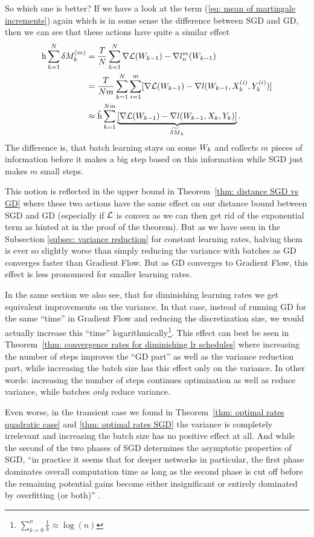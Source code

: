 So which one is better?  If we have a look at the term (\ref{eq: mean of
martingale increments}) again which is in some sense the difference between SGD
and GD, then we can see that these actions have quite a similar effect
\begin{align*}
	\text{h}\sum_{k=1}^N\delta M_k^{(m)}
	&=\frac{T}{N}\sum_{k=1}^N
	\nabla\mathcal{L}(W_{k-1})- \nabla l_n^m(W_{k-1})\\
	&=\frac{T}{Nm}\sum_{k=1}^N\sum_{i=1}^m
	[\nabla\mathcal{L}(W_{k-1})-\nabla l(W_{k-1},X^{(i)}_k, Y^{(i)}_k)]\\
	&\approx \tilde{\text{h}} \sum_{k=1}^{Nm}
	\underbrace{
		[\nabla\mathcal{L}(W_{k-1})-\nabla l(W_{k-1},X_k, Y_k)]
	}_{\widetilde{\delta M}_k}.
\end{align*}
The difference is, that batch learning stays on some \(W_k\) and collects
\(m\) pieces of information before it makes a big step based on this information
while SGD just makes \(m\) small steps.

This notion is reflected in the upper bound in Theorem~\ref{thm: distance SGD vs
GD} where these two actions have the same effect on our distance bound between SGD and
GD (especially if \(\mathcal{L}\) is convex as we can then get rid of the exponential
term as hinted at in the proof of the theorem). But as we have seen in the
Subsection \ref{subsec: variance reduction} for constant learning rates, halving
them is ever so slightly worse than simply reducing the variance
with batches as GD converges faster than Gradient Flow. But as GD converges
to Gradient Flow, this effect is less pronounced for smaller learning rates.

In the same section we also see, that for diminishing learning rates we get
equivalent improvements on the variance.
In that case, instead of running GD for the same ``time'' in Gradient Flow and
reducing the discretization size, we would actually increase this ``time''
logarithmically\footnote{\(\sum_{k=0}^n\tfrac{1}{k}\approx\log(n)\)}. This effect
can best be seen in Theorem~\ref{thm: convergence rates for diminishing lr
schedules} where increasing the number of steps improves the ``GD part'' as well
as the variance reduction part, while increasing the batch size has this
effect only on the variance. In other words: increasing the number of steps
continues optimization as well as reduce variance, while batches \emph{only}
reduce variance.

Even worse, in the transient case we found in Theorem~\ref{thm:
optimal rates quadratic case} and \ref{thm: optimal rates SGD} the variance is
completely irrelevant and increasing the batch size has no positive effect at
all. And while the second of the two phases of SGD \parencite[first observed
by][]{darkenFasterStochasticGradient1991} determines the asymptotic properties
of SGD,  ``in practice it seems that for deeper networks in particular, the first
phase dominates overall computation time as long as the second phase is cut off
before the remaining potential gains become either insignificant or entirely
dominated by overfitting (or both)''  
\parencite{sutskeverImportanceInitializationMomentum2013}.

